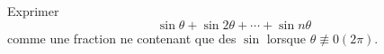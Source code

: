 Exprimer
\[\sin \theta +\sin 2\theta + \cdots +\sin n\theta \]
comme une fraction ne contenant que des $\sin$ lorsque $\theta \not \equiv 0 (2\pi)$.\bigskip\bigskip